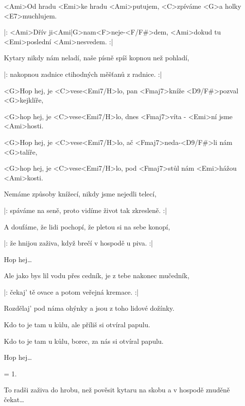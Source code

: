 

\zs
<Ami>Od hradu <Emi>ke hradu <Ami>putujem,
<C>zpíváme <G>a holky <E7>muchlujem.

|: <Ami>Dřív ji<Ami|G>nam\quad <F>neje-<F/F#>dem,
<Ami>dokud tu <Emi>poslední <Ami>nesvedem. :|
\ks

\zs
Kytary nikdy nám neladí,
naše písně spíš kopnou než pohladí,

|: nakopnou zadnice
ctihodných měšťanů z radnice. :|
\ks

\zr
<G>Hop hej, je <C>vese<Emi7/H>lo,
pan <Fmaj7>kníže <D9/F#>pozval <G>kejklíře,

<G>hop hej, je <C>vese<Emi7/H>lo,
dnes <Fmaj7>víta - <Emi>ní jsme <Ami>hosti.

<G>Hop hej, je <C>vese<Emi7/H>lo,
ač <Fmaj7>neda-<D9/F#>li nám <G>talíře,

<G>hop hej, je <C>vese<Emi7/H>lo,
pod <Fmaj7>stůl nám <Emi>hážou <Ami>kosti.
\kr

\zs
Nemáme způsoby knížecí,
nikdy jsme nejedli telecí,

|: spáváme na seně,
proto vidíme život tak zkresleně. :|
\ks

\zs
A doufáme, že lidi pochopí,
že pletou si na sebe konopí,

|: že hnijou zaživa,
když brečí v hospodě u piva. :|
\ks

\zr
Hop hej…
\kr

\zs
Ale jako bys lil vodu přes cedník,
je z tebe nakonec mučedník,

|: čekaj' tě ovace
a potom veřejná kremace. :|
\ks

\zs
Rozdělaj' pod náma ohýnky
a jsou z toho lidové dožínky.

Kdo to je tam u kůlu,
ale příliš si otvíral papulu.

Kdo to je tam u kůlu,
borec, za nás si otvíral papulu.
\ks

\zr
Hop hej…
\kr

\zs
= 1.
\ks

\zs
To radši zaživa do hrobu,
než pověsit kytaru na skobu
a v hospodě znuděně čekat…
\ks

\kp
